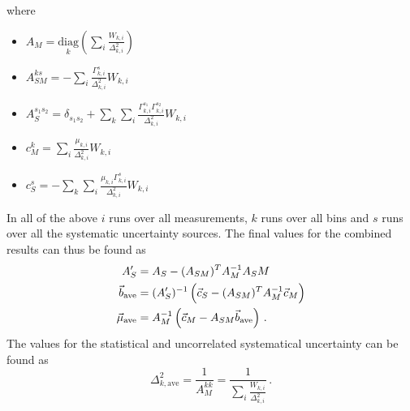 where
\begin{itemize}
\item $A_M = \underset{k}{\mathrm{diag}}\left(\sum\limits_i\frac{W_{k,i}}{\Delta^2_{k,i}}\right)$
\item $A^{ks}_{SM} = - \sum\limits_i\frac{\Gamma^s_{k,i}}{\Delta^2_{k,i}}W_{k,i}$
\item $A^{s_{1}s_{2}}_{S} = \delta_{s_{1}s_{2}} + \sum\limits_k \sum\limits_i \frac{\Gamma^{s_1}_{k,i}\Gamma^{s_2}_{k,i}}{\Delta^2_{k,i}} W_{k,i}$
\item $c^k_M = \sum\limits_i \frac{\mu_{k,i}}{\Delta^2_{k,i}}W_{k,i}$
\item $c^s_S = - \sum\limits_k \sum\limits_i \frac{\mu_{k,i}\Gamma^s_{k,i}}{\Delta^2_{k,i}} W_{k,i}$
\end{itemize}
In all of the above $i$ runs over all measurements, $k$ runs over all bins and $s$ runs over all the systematic uncertainty sources. The final values for the combined results can thus be found as
\begin{equation}
\begin{aligned}
A'_S &= A_S - (A_{SM})^T A^{-1}_M A_SM \\
\vec{b}_\mathrm{ave} &= (A'_S)^{-1}\left(\vphantom{\vec{b}}\vec{c}_S - (A_{SM})^T A^{-1}_M \vec{c}_M\right) \\
\vec{\mu}_\mathrm{ave} &= A^{-1}_M \left(\vec{c}_M - A_{SM}\vec{b}_\mathrm{ave}\right) \,.
\end{aligned}
\end{equation}
The values for the statistical and uncorrelated systematical uncertainty can be found as
\begin{equation}
\Delta_{k,\mathrm{ave}}^2 = \frac{1}{A^{kk}_M} = \frac{1}{\sum\limits_i\frac{W_{k,i}}{\Delta^2_{k,i}}} \,.
\end{equation}
